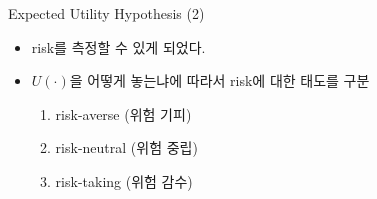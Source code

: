 \documentclass[final]{beamer}
\begin{document}
\begin{frame}[t]{Expected Utility Hypothesis (2)}
	\begin{center}
	\end{center}
	\begin{itemize}
		\item risk를 측정할 수 있게 되었다. 
		\item $U(\cdot)$을 어떻게 놓는냐에 따라서 risk에 대한 태도를 구분 
		\begin{enumerate}
			\item risk-averse (위험 기피)
			\item risk-neutral (위험 중립) 
			\item risk-taking (위험 감수)
		\end{enumerate}
	\end{itemize}
\end{frame}
\end{document}
